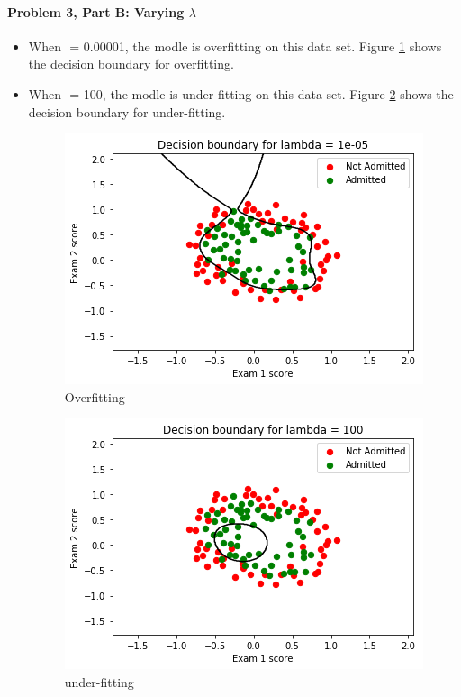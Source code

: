 \documentclass[paper=a4, fontsize=11pt]{scrartcl} %
\numberwithin{equation}{section} %
\numberwithin{figure}{section} %
\numberwithin{table}{section} %
\begin{document}
\paragraph{\textbf{Problem 3, Part B: Varying $\lambda$}}
\begin{itemize}
	\item When $\label{key}$ = 0.00001, the modle is overfitting on this data set. Figure \ref{fig:overfitting} shows the decision boundary for overfitting.
	
	\item When $\label{key}$ = 100, the modle is under-fitting on this data set. Figure \ref{fig:under-fitting} shows the decision boundary for under-fitting.
	
	\begin{figure}
		\centering
		\includegraphics[scale=0.6]{fig4_sk_overfitting.png}
		\caption{Overfitting}
		\label{fig:overfitting}
	\end{figure}
	\begin{figure}
		\centering
		\includegraphics[scale=0.6]{fig4_sk_under-fitting.png}
		\caption{under-fitting}
		\label{fig:under-fitting}
	\end{figure}
\end{itemize}
\end{document}
